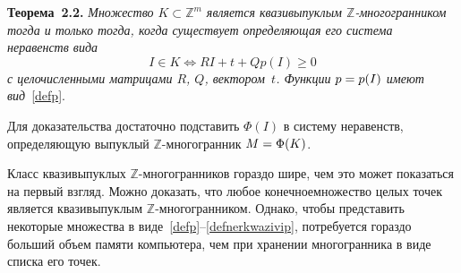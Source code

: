 \begin{multicols}{2}
\noindent
\textbf{Теорема~2.2.}
\textit{Множество $K\subset \mathbb{Z}^m$ является квазивыпуклым
$\mathbb{Z}$-много\-гран\-ником тогда и только тогда, когда
существует определяющая его система неравенств вида}
\begin{equation}
I\in K  \Leftrightarrow RI+t+Qp(I) \geq 0 \label{defnerkwazivip}
\end{equation}
\textit{с целочисленными матрицами $R$, $Q$, вектором~$t$. Функции $p\hm=p(I)$ имеют вид}~\eqref{defp}.

\smallskip

Для доказательства достаточно подставить $\Phi(I)$ в систему неравенств, 
определяющую выпуклый  $\mathbb{Z}$-мно\-го\-гран\-ник $M\hm=\Phi(K)$.

Класс квазивыпуклых $\mathbb{Z}$-мно\-го\-гран\-ни\-ков гораздо шире, чем
это может показаться на первый взгляд. Можно доказать, что любое
конечное\linebreak множество целых точек является квазивыпуклым
$\mathbb{Z}$-много\-гран\-ни\-ком. Однако, чтобы представить
некоторые множества в виде~\eqref{defp}--\eqref{defnerkwazivip},
потребуется гораздо больший объем памяти компьютера, чем при
хранении многогранника в виде списка его точек.


\end{multicols}
